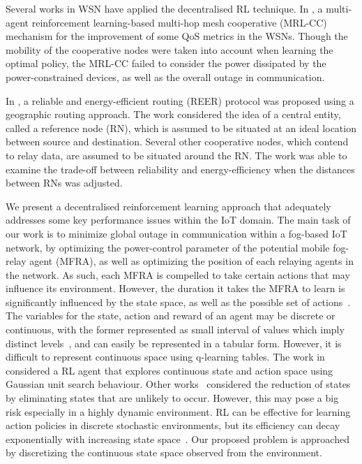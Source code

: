 \documentclass[journal]{IEEEtran}
\begin{document}
Several works in WSN have applied the decentralised RL technique. In \cite{Liang2009}, a multi-agent reinforcement learning-based multi-hop mesh cooperative (MRL-CC) mechanism for the improvement of some QoS metrics in the WSNs. Though the mobility of the cooperative nodes were taken into account when learning the optimal policy, the MRL-CC failed to consider the power dissipated by the power-constrained devices, as well as the overall outage in communication.

In \cite{Chen2008}, a reliable and energy-efficient routing (REER) protocol was proposed using a geographic routing approach. The work considered the idea of a central entity, called a reference node (RN), which is assumed to be situated at an ideal location between source and destination. Several other cooperative nodes, which contend to relay data, are assumed to be situated around the RN. The work was able to examine the trade-off between reliability and energy-efficiency when the distances between RNs was adjusted.


We present a decentralised reinforcement learning approach that adequately addresses some key performance issues within the IoT domain.
The main task of our work is to minimize global outage in communication within a fog-based IoT network, by optimizing the power-control parameter of the potential mobile fog-relay agent (MFRA), as well as optimizing the position of each relaying agents in the network. As such, each MFRA is compelled to take certain actions that may influence its environment. However, the duration it takes the MFRA to learn is significantly influenced by the state space, as well as the possible set of actions~\cite{Dusparic2009}. The variables for the state, action and reward of an agent may be discrete or continuous, with the former represented as small interval of values which imply distinct levels~\cite{Yau2012}, and can easily be represented in a tabular form. However, it is difficult to represent continuous space using q-learning tables. The work in \cite{Vucevic2007} considered a RL agent that explores continuous state and action space using Gaussian unit search behaviour. Other works~\cite{Dusparic2009, Cuayahuitl2006} considered the reduction of states by eliminating states that are unlikely to occur. However, this may pose a big risk especially in a highly dynamic environment. RL can be effective for learning action policies in discrete stochastic environments, but its efficiency can decay exponentially with increasing state space~\cite{Uther1998}. Our proposed problem is approached by discretizing the  continuous state space observed from the environment.
\end{document}
